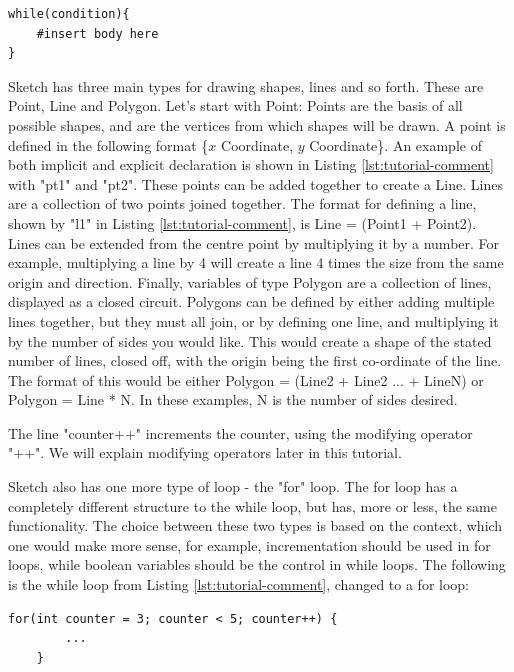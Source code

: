 \documentclass{l3proj}
\begin{document}
\begin{lstlisting}[caption={The "While" Loop},label={lst:tutorial-while},xleftmargin=0.1\textwidth,xrightmargin=0\textwidth]
while(condition){
	#insert body here
} 
\end{lstlisting}

Sketch has three main types for drawing shapes, lines and so forth. These are Point, Line and Polygon. Let's start with Point: Points are the basis of all possible shapes, and are the vertices from which shapes will be drawn. A point is defined in the following format \{$x$ Coordinate, $y$ Coordinate\}. An example of both implicit and explicit declaration is shown in Listing \ref{lst:tutorial-comment} with "pt1" and "pt2". These points can be added together to create a Line. Lines are a collection of two points joined together. The format for defining a line, shown by "l1" in Listing \ref{lst:tutorial-comment}, is Line = (Point1 + Point2). Lines can be extended from the centre point by multiplying it by a number. For example, multiplying a line by 4 will create a line 4 times the size from the same origin and direction. Finally, variables of type Polygon are a collection of lines, displayed as a closed circuit. Polygons can be defined by either adding multiple lines together, but they must all join, or by defining one line, and multiplying it by the number of sides you would like. This would create a shape of the stated number of lines, closed off, with the origin being the first co-ordinate of the line. The format of this would be either Polygon = (Line2 + Line2 ... + LineN) or Polygon = Line * N. In these examples, N is the number of sides desired.

The line "counter++" increments the counter, using the modifying operator "++". We will explain modifying operators later in this tutorial.

Sketch also has one more type of loop - the "for" loop. The for loop has a completely different structure to the while loop, but has, more or less, the same functionality. The choice between these two types is based on the context, which one would make more sense, for example, incrementation should be used in for loops, while boolean variables should be the control in while loops. The following is the while loop from Listing \ref{lst:tutorial-comment}, changed to a for loop:
\clearpage
\begin{lstlisting}[caption={The "For" Loop},label={lst:tutorial-for},xleftmargin=.1\textwidth,xrightmargin=.1\textwidth,]
    for(int counter = 3; counter < 5; counter++) {
        ...
    }
\end{lstlisting}
\end{document}
